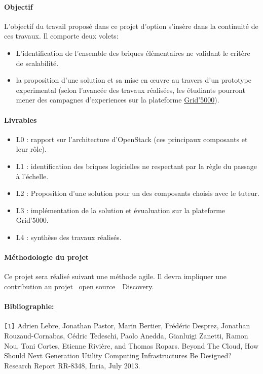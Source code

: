 \documentclass[a4paper,11pt]{article}
\begin{document}
\begin{note}
\paragraph*{Objectif\\}

  L'objectif du travail proposé dans ce projet d'option s'insère dans
  la continuité de ces travaux. Il comporte deux
  volets:
\begin{itemize}
\item L'identification de l'ensemble des briques élémentaires ne
  validant le critère de scalabilité.
\item la proposition d'une solution et sa mise en \oe uvre au travers
  d'un prototype experimental (selon l'avancée des travaux réalisées,
  les étudiants pourront mener des campagnes d'experiences sur la
  plateforme \href{Grid'5000}{Grid'5000}).
\end{itemize}

\paragraph*{Livrables\\}

\begin{itemize}
\item L0 : rapport sur l'architecture d'OpenStack (ces principaux
  composants et leur rôle).
\item L1 : identification des briques logicielles ne respectant par la
  règle du passage à l'échelle.
\item L2 : Proposition d'une solution pour un des composants choisis
  avec le tuteur.
\item L3 : implémentation de la solution et évualuation sur la
  plateforme Grid'5000.
\item L4 : synthèse des travaux réalisés.
\end{itemize}

\paragraph*{Méthodologie du projet\\}
Ce projet sera réalisé suivant une méthode agile. Il devra impliquer une
contribution au projet \og~open source~\fg\ Discovery.


\paragraph*{Bibliographie:\\}
%
\texttt{[1]} Adrien Lebre, Jonathan Pastor, Marin Bertier, Frédéric Desprez, Jonathan Rouzaud-Cornabas, Cédric Tedeschi, Paolo Anedda, Gianluigi Zanetti, Ramon Nou, Toni Cortes, Etienne Rivière, and Thomas Ropars. Beyond The Cloud, How Should Next Generation Utility Computing Infrastructures Be Designed? Research Report RR-8348, Inria, July 2013.\\

\end{note}
\end{document}
